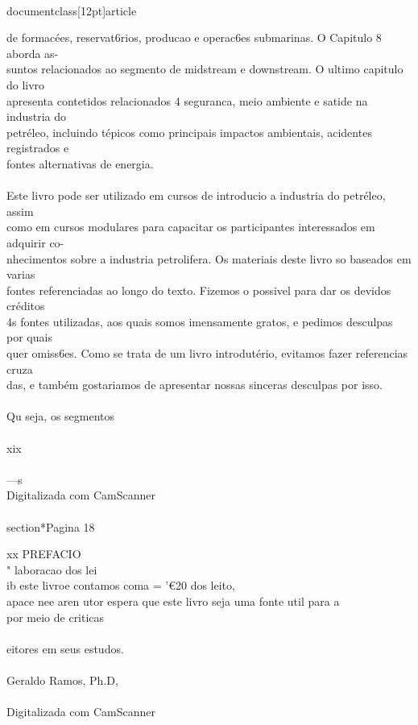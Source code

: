 \\documentclass[12pt]{article}
\begin{document}
{de formacées, reservat6rios, producao e operac6es submarinas. O Capitulo 8 aborda as-\\
suntos relacionados ao segmento de midstream e downstream. O ultimo capitulo do livro\\
apresenta contetidos relacionados 4 seguranca, meio ambiente e satide na industria do\\
petréleo, incluindo tépicos como principais impactos ambientais, acidentes registrados e\\
fontes alternativas de energia.\\
\\
Este livro pode ser utilizado em cursos de introducio a industria do petréleo, assim\\
como em cursos modulares para capacitar os participantes interessados em adquirir co-\\
nhecimentos sobre a industria petrolifera. Os materiais deste livro so baseados em varias\\
fontes referenciadas ao longo do texto. Fizemos o possivel para dar os devidos créditos\\
4s fontes utilizadas, aos quais somos imensamente gratos, e pedimos desculpas por quais\\
quer omiss6es. Como se trata de um livro introdutério, evitamos fazer referencias cruza\\
das, e também gostariamos de apresentar nossas sinceras desculpas por isso.\\
\\
Qu seja, os segmentos\\
\\
xix\\
\\
—s\\
Digitalizada com CamScanner\\

\\section*{Pagina 18}

xx PREFACIO\\
" laboracao dos lei\\
ib este livroe contamos coma = '€20 dos leito,\\
apace nee aren utor espera que este livro seja uma fonte util para a\\
por meio de criticas\\
\\
eitores em seus estudos.\\
\\
Geraldo Ramos, Ph.D,\\
\\
Digitalizada com CamScanner\\

}
\end{document}
